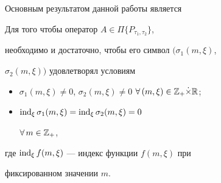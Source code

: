 




Основным результатом данной работы является





\begin{thmnonum}




Для того чтобы оператор $A\in\Pi\{P_{\tau_1,\tau_2}\}$,


необходимо и достаточно, чтобы его символ $(\sigma_1(m,\xi)$,


$\sigma_2(m,\xi))$ удовлетворял условиям


\begin{itemize}


\item [1)] $\sigma_1(m,\xi)\ne 0$, $\sigma_2(m,\xi)\ne 0$ $\forall\,


(m,\xi)\in{\Bbb Z}_+\Dot\times{\Bbb R}$;


\item [2)] $\operatorname{ind}_\xi \sigma_1(m,\xi)=\operatorname{ind}_\xi \sigma_2(m,\xi)=0$


$\forall\, m\in{\Bbb Z}_+$,


\end{itemize}


где $\operatorname{ind}_\xi f(m,\xi)$ --- индекс функции $f(m,\xi)$ при


фиксированном значении $m$.


\end{thmnonum}






